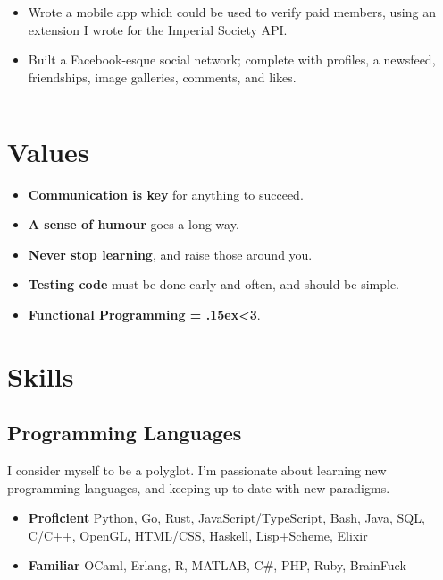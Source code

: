 \documentclass{jcgcv}
\begin{document}
\begin{column}
\begin{itemize}
  \end{itemize}
  \vgap
  \begin{itemize}\setlength\itemsep{0.25em}
    \item Wrote a mobile app which could be used to verify paid members,
          using an extension I wrote for the Imperial Society API.
  \end{itemize}
  \vgap
  \begin{itemize}\setlength\itemsep{0.25em}
    \item Built a Facebook-esque social network; complete with profiles, a
          newsfeed, friendships, image galleries, comments, and likes.
  \end{itemize}

\end{column}\begin{column}

  \section{Values}
  \begin{itemize}
    \item \textbf{Communication is key} for anything to succeed.
    \item \textbf{A sense of humour} goes a long way.
    \item \textbf{Never stop learning}, and raise those around you.
    \item \textbf{Testing code} must be done early and often, and should be simple.
    \item \textbf{Functional Programming = {\raise.15ex\hbox{<}}3}.
  \end{itemize}

  \section{Skills}
  \subsection{Programming Languages}
  I consider myself to be a polyglot. I'm passionate about learning new
  programming languages, and keeping up to date with new paradigms.
  \begin{itemize}
    \item \textbf{Proficient} Python, Go, Rust, JavaScript/TypeScript, Bash, Java,
          SQL, C/C++, OpenGL, HTML/CSS, Haskell, Lisp+Scheme, Elixir
    \item \textbf{Familiar} OCaml, Erlang, R, MATLAB, C\#, PHP, Ruby, BrainFuck
  \end{itemize}

\end{column}
\end{document}
